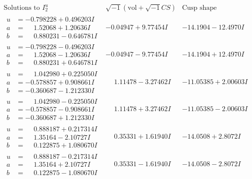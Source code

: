 \documentclass[1p]{elsarticle_modified}
\theoremstyle{definition}
\newcommand{\I}{\sqrt{-1}}
\begin{document}
$$\begin{array}{c|c|c}  
\text{Solutions to }I^u_{2}& \I (\text{vol} + \sqrt{-1}CS) & \text{Cusp shape}\\
 \hline 
\begin{aligned}
u &= -0.798228 + 0.496203 I \\
a &= \phantom{-}1.52068 + 1.20636 I \\
b &= \phantom{-}0.880231 - 0.646781 I\end{aligned}
 & -0.04947 + 9.77454 I & -14.1904 - 12.4970 I \\ \hline\begin{aligned}
u &= -0.798228 - 0.496203 I \\
a &= \phantom{-}1.52068 - 1.20636 I \\
b &= \phantom{-}0.880231 + 0.646781 I\end{aligned}
 & -0.04947 - 9.77454 I & -14.1904 + 12.4970 I \\ \hline\begin{aligned}
u &= \phantom{-}1.042980 + 0.225050 I \\
a &= -0.578857 + 0.908661 I \\
b &= -0.360687 - 1.212330 I\end{aligned}
 & \phantom{-}1.11478 - 3.27462 I & -11.05385 + 2.00603 I \\ \hline\begin{aligned}
u &= \phantom{-}1.042980 - 0.225050 I \\
a &= -0.578857 - 0.908661 I \\
b &= -0.360687 + 1.212330 I\end{aligned}
 & \phantom{-}1.11478 + 3.27462 I & -11.05385 - 2.00603 I \\ \hline\begin{aligned}
u &= \phantom{-}0.888187 + 0.217314 I \\
a &= \phantom{-}1.35164 - 2.10727 I \\
b &= \phantom{-}0.122875 + 1.080670 I\end{aligned}
 & \phantom{-}0.35331 + 1.61940 I & -14.0508 + 2.8072 I \\ \hline\begin{aligned}
u &= \phantom{-}0.888187 - 0.217314 I \\
a &= \phantom{-}1.35164 + 2.10727 I \\
b &= \phantom{-}0.122875 - 1.080670 I\end{aligned}
 & \phantom{-}0.35331 - 1.61940 I & -14.0508 - 2.8072 I \\ \hline\begin{aligned}

\end{aligned}
\end{array}$$
\end{document}

